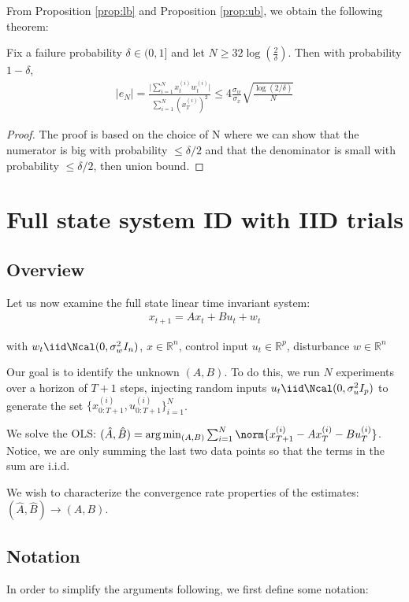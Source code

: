 \documentclass{article}[12pt]
\def \R{\mathbb R}
\begin{document}
From Proposition \ref{prop:lb} and Proposition \ref{prop:ub}, we obtain the following theorem:

\begin{theorem}
	Fix a failure probability $\delta \in (0,1]$ and let $N \geq 32 \log(\frac{2}{\delta})$. Then with probability $1-\delta$, 
	\begin{align*}
	\lvert e_N \rvert = \frac{\lvert \sum_{i=1}^{N} x_t^{(i)}w_t^{(i)}\rvert}{\sum_{i=1}^{N}(x_T^{(i)})^2}
	\leq 4 \frac{\sigma_w}{\sigma_x} \sqrt{\frac{\log(2/\delta)}{N}}
	\end{align*}
\end{theorem}

\begin{proof}
	The proof is based on the choice of N where we can show that the numerator is big with probability $\leq \delta/2$ and that the denominator is small with probability $\leq \delta/2$, then union bound.
\end{proof}
\section{Full state system ID with IID trials}

\subsection{Overview}
Let us now examine the full state linear time invariant system:
\begin{align*}
x_{t+1} = Ax_t + Bu_t + w_t
\end{align*} 
 
with $w_{t} \iid \Ncal(0, \sigma_w^2 I_n)$, 
$x \in \R^n$,
control input
$u_{t} \in \R^p$,
disturbance
$w \in \R^n$

Our goal is to identify the unknown $(A,B)$. 
To do this, we run $N$ experiments over a horizon of $T+1$ steps, injecting random inputs $u_t \iid \Ncal(0, \sigma^2_u I_p)$ to generate the set $\{x^(i)_{0:T+1}, u^(i)_{0:T+1}\}_{i=1}^N$.

We solve the OLS: $(\hat{A}, \hat{B}) = \arg\min_{(A,B)}\sum_{i=1}^{N} \norm{x_{T+1}^{(i)} - Ax_{T}^{(i)}- Bu_{T}^{(i)}}$.
Notice, we are only summing the last two data points so that the terms in the sum are i.i.d.\

We wish to characterize the convergence rate properties of the estimates:
$(\hat{A}, \hat{B}) \rightarrow(A,B)$.

\subsection{Notation}
In order to simplify the arguments following, we first define some notation:
\end{document}
